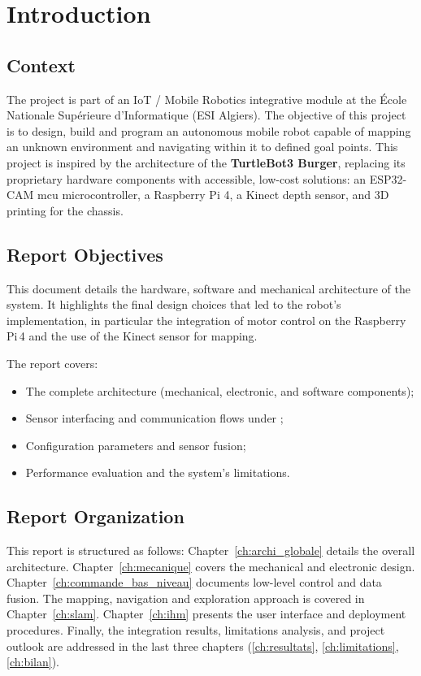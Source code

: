 \chapter{Introduction}
\label{ch:intro}

\section{Context}
\label{sec:intro_contexte}

The \esibot{} project is part of an IoT / Mobile Robotics integrative module at the
École Nationale Supérieure d'Informatique (ESI Algiers). The objective of this project
is to design, build and program an autonomous mobile robot capable of mapping an unknown
environment and navigating within it to defined goal points. This project is inspired by
the architecture of the \textbf{TurtleBot3 Burger}, replacing its proprietary hardware
components with accessible, low-cost solutions: an ESP32-CAM \gls{mcu} microcontroller, a
Raspberry Pi 4, a Kinect depth sensor, and 3D printing for the chassis.

\section{Report Objectives}
\label{sec:intro_objectifs}

This document details the hardware, software and mechanical architecture of the system.
It highlights the final design choices that led to the robot's implementation, in
particular the integration of motor control on the Raspberry\,Pi\,4 and the use of the
Kinect sensor for mapping.

The report covers:
\begin{itemize}
	\item The complete architecture (mechanical, electronic, and software components);
	\item Sensor interfacing and communication flows under \ros{};
	\item Configuration parameters and sensor fusion;
	\item Performance evaluation and the system's limitations.
\end{itemize}

\section{Report Organization}
\label{sec:intro_organisation}

This report is structured as follows:
Chapter~\ref{ch:archi_globale} details the overall architecture. Chapter~\ref{ch:mecanique}
covers the mechanical and electronic design. Chapter~\ref{ch:commande_bas_niveau} documents
low-level control and data fusion. The mapping, navigation and exploration approach is
covered in Chapter~\ref{ch:slam}. Chapter~\ref{ch:ihm} presents the user interface and
deployment procedures. Finally, the integration results, limitations analysis, and project
outlook are addressed in the last three chapters
(\ref{ch:resultats}, \ref{ch:limitations}, \ref{ch:bilan}).
